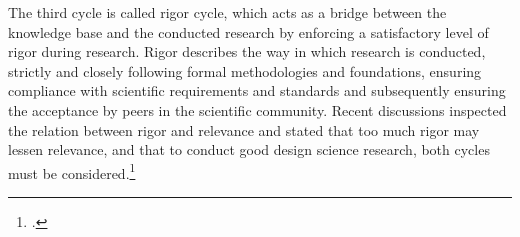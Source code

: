 The third cycle is called rigor cycle, which acts as a bridge between the knowledge base and the conducted research by enforcing a satisfactory level of rigor during research. Rigor describes the way in which research is conducted, strictly and closely following formal methodologies and foundations, ensuring compliance with scientific requirements and standards and subsequently ensuring the acceptance by peers in the scientific community. Recent discussions inspected the relation between rigor and relevance and stated that too much rigor may lessen relevance, and that to conduct good design science research, both cycles must be considered.\footcites[Cf.][p.5]{BenbasatEmpiricalresearchinformation1999}[cf.][p.88]{HevnerDesignScienceResearch2004}[cf.][p.130]{ThomasBekannteundweniger2014}[cf.][p.91]{Hevnerthreecycleview2007}
